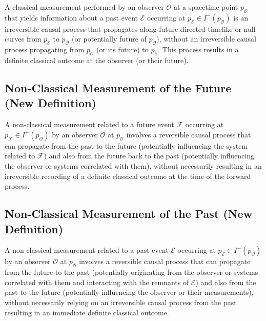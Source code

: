 	\begin{definition}
		A classical measurement performed by an observer $\mathcal{O}$ at a spacetime point $p_{\mathcal{O}}$ that yields information about a past event $\mathcal{E}$ occurring at $p_{\mathcal{E}} \in I^-(p_{\mathcal{O}})$ is an irreversible causal process that propagates along future-directed timelike or null curves from $p_{\mathcal{E}}$ to $p_{\mathcal{O}}$ (or potentially future of $p_{\mathcal{O}}$), without an irreversible causal process propagating from $p_{\mathcal{O}}$ (or its future) to $p_{\mathcal{E}}$. This process results in a definite classical outcome at the observer (or their future).
	\end{definition}
	
	\subsection{Non-Classical Measurement of the Future (New Definition)}
	
	\begin{definition}
		A non-classical measurement related to a future event $\mathcal{F}$ occurring at $p_{\mathcal{F}} \in I^+(p_{\mathcal{O}})$ by an observer $\mathcal{O}$ at $p_{\mathcal{O}}$ involves a reversible causal process that can propagate from the past to the future (potentially influencing the system related to $\mathcal{F}$) and also from the future back to the past (potentially influencing the observer or systems correlated with them), without necessarily resulting in an irreversible recording of a definite classical outcome at the time of the forward process.
	\end{definition}
	
	\subsection{Non-Classical Measurement of the Past (New Definition)}
	
	\begin{definition}
		A non-classical measurement related to a past event $\mathcal{E}$ occurring at $p_{\mathcal{E}} \in I^-(p_{\mathcal{O}})$ by an observer $\mathcal{O}$ at $p_{\mathcal{O}}$ involves a reversible causal process that can propagate from the future to the past (potentially originating from the observer or systems correlated with them and interacting with the remnants of $\mathcal{E}$) and also from the past to the future (potentially influencing the observer or their measurements), without necessarily relying on an irreversible causal process from the past resulting in an immediate definite classical outcome.
	\end{definition}
	
